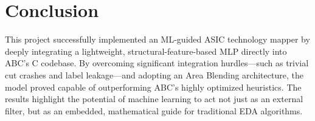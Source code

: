 \documentclass[11pt,a4paper]{article}
\begin{document}
\section{Conclusion}
This project successfully implemented an ML-guided ASIC technology mapper by deeply integrating a lightweight, structural-feature-based MLP directly into ABC's C codebase. By overcoming significant integration hurdles—such as trivial cut crashes and label leakage—and adopting an Area Blending architecture, the model proved capable of outperforming ABC's highly optimized heuristics. The results highlight the potential of machine learning to act not just as an external filter, but as an embedded, mathematical guide for traditional EDA algorithms.
\end{document}
